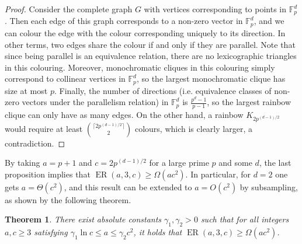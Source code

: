 \documentclass[11pt]{article}
\theoremstyle{plain}
\newtheorem{theorem}{Theorem}[section]
\theoremstyle{definition}
\newcommand{\offerado}[3]{\operatorname{ER}(#1,#2,#3)}
\begin{document}
\begin{proof}
    Consider the complete graph $G$ with vertices corresponding to points in $\mathbb{F}_p^d$. Then each edge of this graph corresponds to a non-zero vector in $\mathbb{F}_p^d$, and we can colour the edge with the colour corresponding uniquely to its direction. In other terms, two edges share the colour if and only if they are parallel. Note that since being parallel is an equivalence relation, there are no lexicographic triangles in this colouring. Moreover, monochromatic cliques in this colouring simply correspond to collinear vertices in $\mathbb{F}_p^d$, so the largest monochromatic clique has size at most $p$. Finally, the number of directions (i.e. equivalence classes of non-zero vectors under the parallelism relation) in $\mathbb{F}_p^d$ is $\frac{p^d-1}{p-1}$, so the largest rainbow clique can only have as many edges. On the other hand, a rainbow $K_{2p^{(d-1)/2}}$ would require at least $\binom{\lceil2p^{(d-1)/2}\rceil}{2}$ colours, which is clearly larger, a contradiction.
\end{proof}

By taking $a=p+1$ and $c=2p^{(d-1)/2}$ for a large prime $p$ and some $d$, the last proposition implies that $\offerado{a}{3}{c}\ge \Omega(ac^2)$. In particular, for $d=2$ one gets $a=\Theta(c^2)$, and this result can be extended to $a=O(c^2)$ by subsampling, as shown by the following theorem.

\begin{theorem}\label{thm-b3-small-a}
    There exist absolute constants $\gamma_1,\gamma_2>0$ such that for all integers $a,c\ge 3$ satisfying $\gamma_1\ln c\le a\le \gamma_2 c^2$, it holds that $\offerado a3c \ge \Omega(ac^2)$.
\end{theorem}
\end{document}
